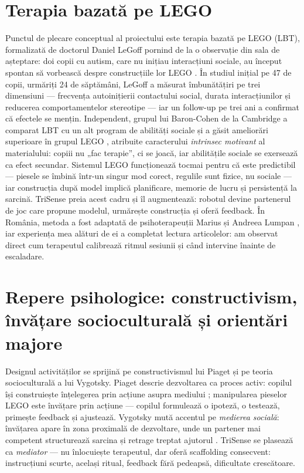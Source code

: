 \section{Terapia bazată pe LEGO}

Punctul de plecare conceptual al proiectului este terapia bazată pe LEGO (LBT), formalizată de doctorul Daniel LeGoff pornind de la o observație din sala de așteptare: doi copii cu autism, care nu inițiau interacțiuni sociale, au început spontan să vorbească despre construcțiile lor LEGO \cite{legoff2004}. În studiul inițial pe 47 de copii, urmăriți 24 de săptămâni, LeGoff a măsurat îmbunătățiri pe trei dimensiuni — frecvența autoinițierii contactului social, durata interacțiunilor și reducerea comportamentelor stereotipe — iar un follow-up pe trei ani \cite{legoff2006} a confirmat că efectele se mențin. Independent, grupul lui Baron-Cohen de la Cambridge a comparat LBT cu un alt program de abilități sociale și a găsit ameliorări superioare în grupul LEGO \cite{owens2008}, atribuite caracterului \emph{intrinsec motivant} al materialului: copiii nu „fac terapie”, ci se joacă, iar abilitățile sociale se exersează ca efect secundar. Sistemul LEGO funcționează tocmai pentru că este predictibil — piesele se îmbină într-un singur mod corect, regulile sunt fizice, nu sociale — iar construcția după model implică planificare, memorie de lucru și persistență la sarcină. TriSense preia acest cadru și îl augmentează: robotul devine partenerul de joc care propune modelul, urmărește construcția și oferă feedback. În România, metoda a fost adaptată de psihoterapeuții Marius și Andreea Lumpan \cite{lumpanagerpres2025}, iar experiența mea alături de ei a completat lectura articolelor: am observat direct cum terapeutul calibrează ritmul sesiunii și când intervine înainte de escaladare.

\section{Repere psihologice: constructivism, învățare socioculturală și orientări majore}

Designul activităților se sprijină pe constructivismul lui Piaget și pe teoria socioculturală a lui Vygotsky. Piaget descrie dezvoltarea ca proces activ: copilul își construiește înțelegerea prin acțiune asupra mediului \cite{piaget1969}; manipularea pieselor LEGO este învățare prin acțiune — copilul formulează o ipoteză, o testează, primește feedback și ajustează. Vygotsky mută accentul pe \emph{medierea socială}: învățarea apare în zona proximală de dezvoltare, unde un partener mai competent structurează sarcina și retrage treptat ajutorul \cite{vygotsky1978}. TriSense se plasează ca \emph{mediator} — nu înlocuiește terapeutul, dar oferă scaffolding consecvent: instrucțiuni scurte, același ritual, feedback fără pedeapsă, dificultate crescătoare.

